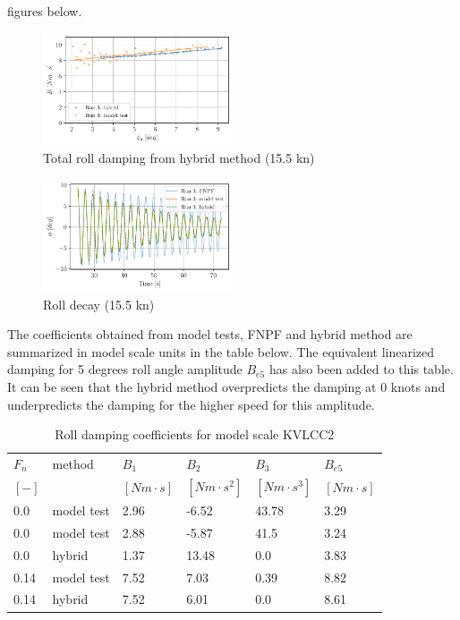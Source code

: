 figures below.
\begin{figure}[H]
\begin{center}\includegraphics[width = 0.5\textwidth]{figures/hybrid_speed_amplitudes.pdf}\end{center}
\vspace{-1cm}
\caption{Total roll damping from hybrid method (15.5 kn)}
\label{fig:hybrid_speed_amplitudes}
\end{figure}
\begin{figure}[H]
\begin{center}\includegraphics[width = 0.5\textwidth]{figures/hybrid_speed_time.pdf}\end{center}
\vspace{-1cm}
\caption{Roll decay (15.5 kn)}
\label{fig:hybrid_speed_time}
\end{figure}
The coefficients obtained from model tests, FNPF and hybrid method are
summarized in model scale units in the table below. The equivalent
linearized damping for 5 degrees roll angle amplitude $B_{e5}$ has
also been added to this table. It can be seen that the hybrid method
overpredicts the damping at 0 knots and underpredicts the damping for
the higher speed for this amplitude.
\begin{table}[H]
\scriptsize
\center
\caption{Roll damping coefficients for model scale KVLCC2}
\label{tab:results}
\begin{tabular}{|l|l|l|l|l|l|}
\hline\addlinespace
$F_n$ & method & $B_1$ & $B_2$ & $B_3$ & $B_{e5}$\\
$[-]$ &  & $[Nm \cdot s]$ & $[Nm \cdot s^2]$ & $[Nm \cdot s^3]$ & $[Nm \cdot s]$\\
\hline0.0 & model test & 2.96 & -6.52 & 43.78 & 3.29\\
0.0 & model test & 2.88 & -5.87 & 41.5 & 3.24\\
0.0 & hybrid & 1.37 & 13.48 & 0.0 & 3.83\\
0.14 & model test & 7.52 & 7.03 & 0.39 & 8.82\\
0.14 & hybrid & 7.52 & 6.01 & 0.0 & 8.61\\
\hline
\end{tabular}
\end{table}
